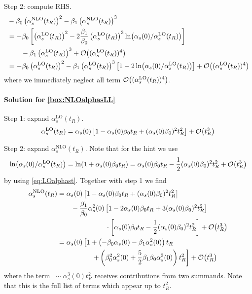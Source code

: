 Step 2: compute RHS.
\begin{align}
    &-\beta_0 \left(\alpha_s^\text{NLO}(t_R)\right)^2 -\beta_1 \left(\alpha_s^\text{NLO}(t_R)\right)^3 \nonumber\\
    &=-\beta_0 \left[\left(\alpha_s^\text{LO}(t_R)\right)^2 - 2 \frac{\beta_1}{\beta_0} \left(\alpha_s^\text{LO}(t_R)\right)^3 \ln(\alpha_s(0) / \alpha_s^\text{LO}(t_R)) \right] \nonumber\\
    &\hspace{20pt} - \beta_1 \left(\alpha_s^\text{LO}(t_R)\right)^3 + \order{(\alpha_s^\text{LO}(t_R))^4}\\
    &= -\beta_0 \left(\alpha_s^\text{LO}(t_R)\right)^2 - \beta_1\left(\alpha_s^\text{LO}(t_R)\right)^3\left[1  -2\ln(\alpha_s(0) / \alpha_s^\text{LO}(t_R))\right]  + \order{(\alpha_s^\text{LO}(t_R))^4}
\end{align}
where we immediately neglect all term $\order{(\alpha_s^\text{LO}(t_R))^4}$.

\paragraph{Solution for \cref{box:NLOalphasLL}}
Step 1: expand $\alpha_s^\text{LO}(t_R)$.
\begin{equation}
    \alpha_s^\text{LO}(t_R) = \alpha_s(0)\left[1 - \alpha_s(0)\beta_0 t_R + (\alpha_s(0)\beta_0)^2 t_R^2 \right] + \order{t_R^3}
\end{equation}

Step 2: expand $\alpha_s^\text{NLO}(t_R)$.
Note that for the hint we use
\begin{equation}
    \ln(\alpha_s(0)/\alpha_s^\text{LO}(t_R)) = \ln(1 + \alpha_s(0)\beta_0 t_R) = \alpha_s(0) \beta_0 t_R - \frac 1 2 (\alpha_s(0)\beta_0)^2 t_R^2  + \order{t_R^3}
\end{equation}
by using \cref{eq:LOalphast}.
Together with step 1 we find
\begin{align}
    \alpha_s^\text{NLO}(t_R) &= \alpha_s(0)\left[1 - \alpha_s(0)\beta_0 t_R + (\alpha_s(0)\beta_0)^2 t_R^2 \right] \nonumber\\
    &\hspace{20pt} - \frac{\beta_1}{\beta_0} \alpha_s^2(0) \left[1 - 2\alpha_s(0)\beta_0 t_R + 3(\alpha_s(0)\beta_0)^2 t_R^2 \right]\nonumber\\
    &\hspace{70pt} \cdot \left[\alpha_s(0) \beta_0 t_R - \frac 1 2 (\alpha_s(0)\beta_0)^2 t_R^2 \right] + \order{t_R^3}\\
    &= \alpha_s(0)\left[1 + \left(-\beta_0\alpha_s(0) - \beta_1\alpha_s^2(0) \right) t_R\right. \nonumber\\
    &\hspace{50pt}\left. +\left(\beta_0^2 \alpha_s^2(0) + \frac 5 2 \beta_1 \beta_0 \alpha_s^3(0) \right)t_R^2 \right]  + \order{t_R^3} \label{eq:solresumNLLexp}
\end{align}
where the term $~\sim \alpha_s^3(0) t_R^2$ receives contributions from two summands.
Note that this is the full list of terms which appear up to $t_R^2$.

